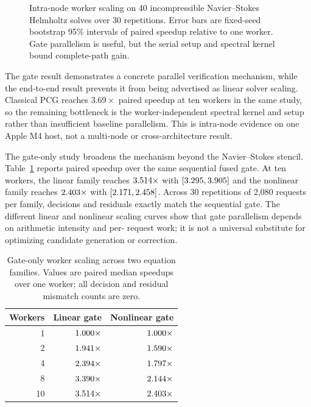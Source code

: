 \begin{figure}[t]
\centering

\caption{Intra-node worker scaling on 40 incompressible Navier--Stokes Helmholtz
solves over 30 repetitions. Error bars are fixed-seed bootstrap 95\% intervals of
paired speedup relative to one worker. Gate parallelism is useful, but the serial
setup and spectral kernel bound complete-path gain.}
\label{fig:ns-scaling}
\end{figure}

The gate result demonstrates a concrete parallel verification mechanism, while the
end-to-end result prevents it from being advertised as linear solver scaling.
Classical PCG reaches $3.69\times$ paired speedup at ten workers in the same study,
so the remaining \system bottleneck is the worker-independent spectral kernel and
setup rather than insufficient baseline parallelism. This is intra-node evidence
on one Apple M4 host, not a multi-node or cross-architecture result.

The gate-only study broadens the mechanism beyond the Navier--Stokes stencil.
Table~\ref{tab:gate-family-scaling} reports paired speedup over the same sequential
fused gate. At ten workers, the linear family reaches
$3.514\times$ with
$[3.295,3.905]$ and the nonlinear family reaches
$2.403\times$ with
$[2.171,2.458]$. Across 30 repetitions of 2,080
requests per family, decisions and
residuals exactly match the sequential gate. The different linear and nonlinear
scaling curves show that gate parallelism depends on arithmetic intensity and per-
request work; it is not a universal substitute for optimizing candidate generation
or correction.

\begin{table}[t]
\centering
\footnotesize
\caption{Gate-only worker scaling across two equation families. Values are paired
median speedups over one worker; all decision and residual mismatch counts are zero.}
\label{tab:gate-family-scaling}
\begin{tabular}{rrr}
\toprule
Workers & Linear gate & Nonlinear gate \\
\midrule
1 & $1.000\times$ & $1.000\times$ \\
2 & $1.941\times$ & $1.590\times$ \\
4 & $2.394\times$ & $1.797\times$ \\
8 & $3.390\times$ & $2.144\times$ \\
10 & $3.514\times$ & $2.403\times$ \\
\bottomrule
\end{tabular}
\end{table}

